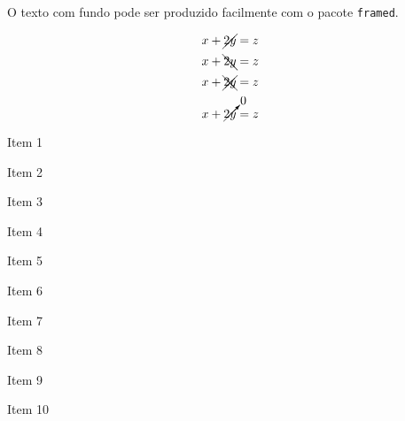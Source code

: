 \usepackage{contour}

{\Huge {}}

\begin{shaded∗}
O texto com fundo pode ser produzido facilmente com o pacote \texttt{framed}.
\end{shaded∗}

\usepackage{eso-pic}
%


\usepackage{cancel}
\renewcommand{\CancelColor}{\color{red}} %
\[x+\cancel{2y} = z \]
\[x+\bcancel{2y} = z \]
\[x+\xcancel{2y} = z \]
\[x+\cancelto{0}{2y} = z \]


\begin{enumerate*}[1.,itemjoin={\tab}]
\item Item 1
\item Item 2
\item Item 3
\item Item 4
\item Item 5
\item Item 6
\item Item 7
\item Item 8
\item Item 9
\item Item 10
\end{enumerate*}
